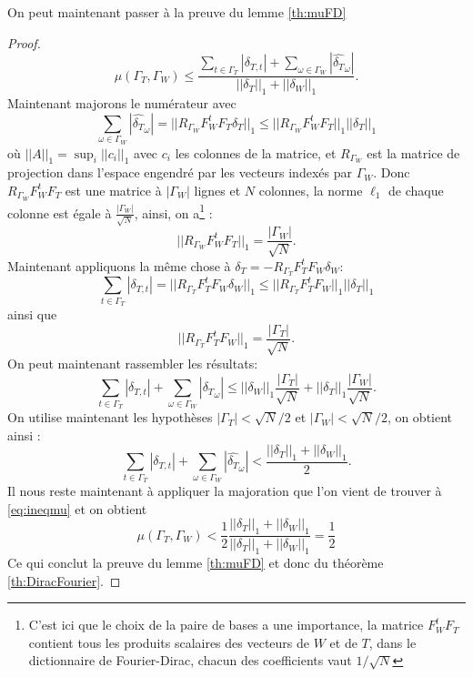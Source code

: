 	On peut maintenant passer à la preuve du lemme \ref{th:muFD}
	\begin{proof}
		\begin{equation}\label{eq:ineqmu}
			\mu(\Gamma_T, \Gamma_W) \leq \frac{\sum_{t \in \Gamma_T} |\delta_{T, t}| + \sum_{\omega \in \Gamma_W} |\widehat{\delta_{T}}_\omega|}{||\delta_T||_1 + ||\delta_W||_1}. 
		\end{equation}
		Maintenant majorons le numérateur avec 
		\begin{equation}\label{eq:ineqnum}
			\sum_{\omega \in \Gamma_W} |\widehat{\delta_T}_\omega| = ||R_{\Gamma_W} F_W^t F_T \delta_T||_1 \leq ||R_{\Gamma_W} F_W^t F_T ||_1 ||\delta_T||_1 
		\end{equation}
		où $||A||_1 = \sup_i ||c_i||_1$ avec $c_i$ les colonnes de la matrice, et $R_{\Gamma_W}$ est la matrice de projection dans l'espace engendré par les vecteurs indexés par $\Gamma_W$.
		Donc $R_{\Gamma_W} F_W^t F_T$ est une matrice à $|\Gamma_W|$ lignes et $N$ colonnes, la norme $\ell_1$ de chaque colonne est égale à $\frac{|\Gamma_W|}{\sqrt{N}}$, ainsi, on a\footnote{C'est ici que le choix de la paire de bases a une importance, la matrice $F_W^t F_T$ contient tous les produits scalaires des vecteurs de $W$ et de $T$, dans le dictionnaire de Fourier-Dirac, chacun des coefficients vaut $1/\sqrt{N}$} :
		\begin{equation}\label{eq:ineqdelta1}
			||R_{\Gamma_W} F_W^t F_T||_1 = \frac{|\Gamma_W|}{\sqrt{N}}.
		\end{equation}	
			Maintenant appliquons la même chose à $\delta_T = -R_{\Gamma_T}F_T^tF_W \delta_W$:
			\begin{equation}
				\sum_{t \in \Gamma_T} |\delta_{T,t}| = ||R_{\Gamma_T} F_T^t F_W \delta_W||_1 \leq ||R_{\Gamma_T} F_T^t F_W ||_1 ||\delta_T||_1 
			\end{equation}
		ainsi que
		\begin{equation}
			||R_{\Gamma_T} F_T^t F_W||_1 = \frac{|\Gamma_T|}{\sqrt{N}}.
		\end{equation}
		On peut maintenant rassembler les résultats:
		\begin{equation}
			\sum_{t \in \Gamma_T} |\delta_{T, t}| + \sum_{\omega \in \Gamma_W} |\widehat{\delta_T}_\omega| 
			\leq ||\delta_{W}||_1 \frac{|\Gamma_T|}{\sqrt{N}} + ||\delta_{T}||_1 \frac{|\Gamma_W|}{\sqrt{N}}. 
		\end{equation}
			On utilise maintenant les hypothèses $|\Gamma_T| < \sqrt{N}/2$ et $|\Gamma_W| < \sqrt{N}/2$, on obtient ainsi :
		\begin{equation}
			\sum_{t \in \Gamma_T} |\delta_{T, t}| + \sum_{\omega \in \Gamma_W} |\widehat{\delta_T}_\omega| 
			< \frac{||\delta_{T}||_1 + ||\delta_{W}||_1 }{2}.
		\end{equation}
			Il nous reste maintenant à appliquer la majoration que l'on vient de trouver à \ref{eq:ineqmu} et on obtient
		\begin{equation}
			\mu(\Gamma_T, \Gamma_W) < \frac{1}{2} \frac{||\delta_T||_1 + ||\delta_W||_1}{||\delta_T||_1 + ||\delta_W||_1} = \frac{1}{2} 
		\end{equation}
			Ce qui conclut la preuve du lemme \ref{th:muFD} et donc du théorème \ref{th:DiracFourier}.
	\end{proof}

